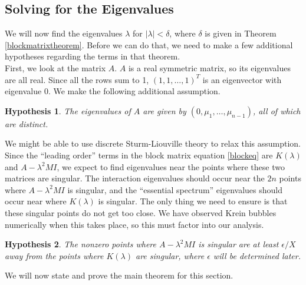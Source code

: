 \documentclass[12pt]{article}
\newtheorem{hypothesis}{Hypothesis}
\begin{document}
\subsection{Solving for the Eigenvalues}

We will now find the eigenvalues $\lambda$ for $|\lambda| < \delta$, where $\delta$ is given in Theorem \ref{blockmatrixtheorem}. Before we can do that, we need to make a few additional hypotheses regarding the terms in that theorem.\\

First, we look at the matrix $A$. $A$ is a real symmetric matrix, so its eigenvalues are all real. Since all the rows sum to 1, $(1, 1, \dots, 1)^T$ is an eigenvector with eigenvalue 0. We make the following additional assumption.\\

\begin{hypothesis}\label{Adistincteigs}
The eigenvalues of $A$ are given by $(0, \mu_1, \dots, \mu_{n-1})$, all of which are distinct.
\end{hypothesis}

We might be able to use discrete Sturm-Liouville theory to relax this assumption.\\

Since the ``leading order'' terms in the block matrix equation \ref{blockeq} are $K(\lambda)$ and $A - \lambda^2 M I$, we expect to find eigenvalues near the points where these two matrices are singular. The interaction eigenvalues should occur near the $2n$ points where $A - \lambda^2 M I$ is singular, and the ``essential spectrum'' eigenvalues should occur near where $K(\lambda)$ is singular. The only thing we need to ensure is that these singular points do not get too close. We have observed Krein bubbles numerically when this takes place, so this must factor into our analysis.

\begin{hypothesis}\label{epsilonballs}
The nonzero points where $A - \lambda^2 MI$ is singular are at least $\epsilon/X$ away from the points where $K(\lambda)$ are singular, where $\epsilon$ will be determined later.
\end{hypothesis}

We will now state and prove the main theorem for this section.
\end{document}
